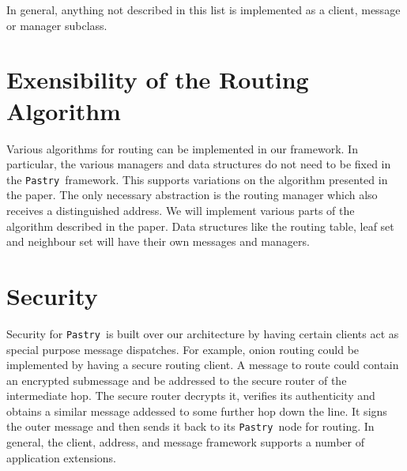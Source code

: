 \documentclass{article}
\newcommand{\pastry}{{\tt Pastry }}
\begin{document}
In general, anything not described in this list is implemented as a
client, message or manager subclass.

\section*{Exensibility of the Routing Algorithm}

Various algorithms for routing can be implemented in our framework.  In
particular, the various managers and data structures do not need to be
fixed in the \pastry framework.  This supports variations on the
algorithm presented in the paper.  The only necessary abstraction is
the routing manager which also receives a distinguished address.  We
will implement various parts of the algorithm described in the paper.
Data structures like the routing table, leaf set and neighbour set
will have their own messages and managers.

\section*{Security}

Security for \pastry is built over our architecture by having certain
clients act as special purpose message dispatches.  For example, onion
routing could be implemented by having a secure routing client.  A
message to route could contain an encrypted submessage and be
addressed to the secure router of the intermediate hop.  The secure
router decrypts it, verifies its authenticity and obtains a similar
message addessed to some further hop down the line.  It signs the
outer message and then sends it back to its \pastry node for routing.
In general, the client, address, and message framework supports a
number of application extensions.
\end{document}
